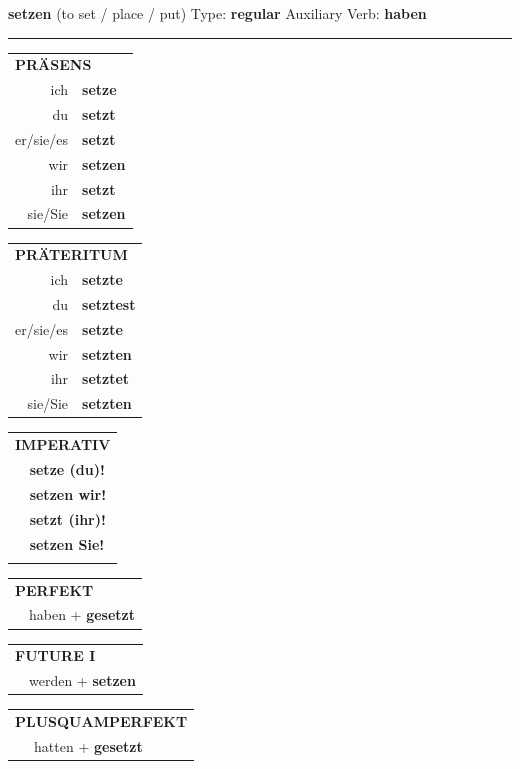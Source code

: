 \documentclass[10pt,a4paper]{revtex4-2}
\begin{document}
\begin{verbbox}
    {\Large \bf setzen} (to set / place / put) \hfill Type: \textbf{regular} \hfill Auxiliary Verb: \textbf{haben} 
    
     \vspace{5pt}

    \hrule
    
    \vspace{5pt}

  \begin{tabular}{rl}
     \multicolumn{2}{l}{\textbf{PRÄSENS} }\\
    ich & \textbf{setze}\\
    du & \textbf{setzt}\\
    er/sie/es & \textbf{setzt}\\
    wir & \textbf{setzen}\\
    ihr & \textbf{setzt}\\
    sie/Sie & \textbf{setzen}\\
  \end{tabular}
  \hfill
  \begin{tabular}{rl}
    \multicolumn{2}{l}{\textbf{PRÄTERITUM} }\\
    ich & \textbf{setzte}\\
    du & \textbf{setztest}\\
    er/sie/es & \textbf{setzte}\\
    wir & \textbf{setzten}\\
    ihr & \textbf{setztet}\\
    sie/Sie & \textbf{setzten}\\
  \end{tabular}
  \hfill
  \begin{tabular}{rl}
     \multicolumn{2}{l}{\textbf{IMPERATIV} }\\
   & \textbf{setze (du)!}\\
   & \textbf{setzen wir!}\\
   & \textbf{setzt (ihr)!}\\
   & \textbf{setzen Sie!}\\
   & \vspace{10pt}
  \end{tabular}

 \vspace{10pt}

 \begin{tabular}{rl}
     \multicolumn{2}{l}{\textbf{PERFEKT}}\\
   & haben + \textbf{gesetzt}\\
  \end{tabular}
\hfill
\begin{tabular}{rl}
    \multicolumn{2}{l}{\textbf{FUTURE I}}\\
   & werden + \textbf{setzen}\\
  \end{tabular}
\hfill
\begin{tabular}{rl}
    \multicolumn{2}{l}{\textbf{PLUSQUAMPERFEKT}}\\
   & hatten + \textbf{gesetzt}\\
  \end{tabular}


\end{verbbox}
\end{document}
